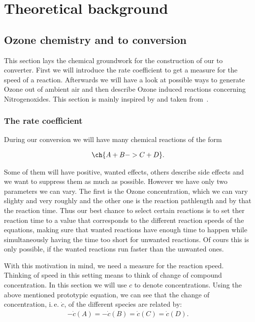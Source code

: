 \section{Theoretical background}
\label{sec:theory}


\subsection{Ozone chemistry and  to  conversion}
\label{sec:chemistry}

This section lays the chemical groundwork for the construction of our
 to  converter. First we will introduce the rate
coefficient to get a measure for the speed of a
reaction. Afterwards we will have a look at possible ways to generate
Ozone out of ambient air and then describe Ozone induced reactions
concerning Nitrogenoxides. This section is mainly inspired by and
taken from~\cite{bsc}.

\subsubsection{The rate coefficient}
\label{sec:rate}

During our conversion we will have many chemical reactions of the form

\begin{align*}
  \ch{A + B -> C + D}.
\end{align*}

Some of them will have positive, wanted effects, others describe side
effects and we want to suppress them as much as possible. However we
have only two parameters we can vary. The first is the Ozone
concentration, which we can vary slighty and very roughly and the
other one is the reaction pathlength and by that the reaction
time. Thus our best chance to select certain reactions is to set ther
reaction time to a value that corresponds to the different reaction
speeds of the equations, making sure that wanted reactions have enough
time to happen while simultaneously having the time too short for
unwanted reactions. Of cours this is only possible, if the wanted
reactions run faster than the unwanted ones. 

With this motivation in mind, we need a measure for the reaction
speed. Thinking of speed in this setting means to think of change of
compound concentration. In this section we will use $c$ to denote
concentrations. Using the above mentioned prototypic equation, we can
see that the change of concentration, i.\,e. $\dot c$, of the
different species are related by:
\begin{align*}
  -\dot c(A) = - \dot c(B) = \dot c(C) = \dot c(D).
\end{align*}


